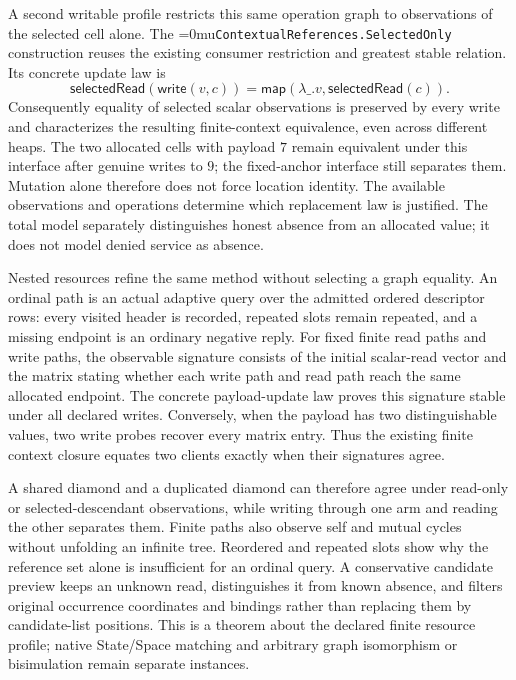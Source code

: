 \documentclass[11pt]{article}
\newcommand{\leanname}[1]{\textup{\Urlmuskip=0mu\relax\nolinkurl{#1}}}
\theoremstyle{definition}
\theoremstyle{remark}
\begin{document}
A second writable profile restricts this same operation graph to observations
of the selected cell alone. The
\leanname{ContextualReferences.SelectedOnly} construction reuses the existing
consumer restriction and greatest stable relation. Its concrete update law is
\[
  \mathsf{selectedRead}(\mathsf{write}(v,c))
   =\mathsf{map}(\lambda\_.v,\mathsf{selectedRead}(c)).
\]
Consequently equality of selected scalar observations is preserved by every
write and characterizes the resulting finite-context equivalence, even
across different heaps. The two allocated cells with payload $7$ remain
equivalent under this interface after genuine writes to $9$; the fixed-anchor
interface still separates them. Mutation alone therefore does not force
location identity. The available observations and operations determine which
replacement law is justified. The total model separately distinguishes honest
absence from an allocated value; it does not model denied service as absence.

Nested resources refine the same method without selecting a graph equality.
An ordinal path is an actual adaptive query over the admitted ordered
descriptor rows: every visited header is recorded, repeated slots remain
repeated, and a missing endpoint is an ordinary negative reply. For fixed
finite read paths and write paths, the observable signature consists of the
initial scalar-read vector and the matrix stating whether each write path and
read path reach the same allocated endpoint. The concrete payload-update law
proves this signature stable under all declared writes. Conversely, when the
payload has two distinguishable values, two write probes recover every matrix
entry. Thus the existing finite context closure equates two clients exactly
when their signatures agree.

A shared diamond and a duplicated diamond can therefore agree under read-only
or selected-descendant observations, while writing through one arm and reading
the other separates them. Finite paths also observe self and mutual cycles
without unfolding an infinite tree. Reordered and repeated slots show why the
reference set alone is insufficient for an ordinal query. A conservative
candidate preview keeps an unknown read, distinguishes it from known absence,
and filters original occurrence coordinates and bindings rather than replacing
them by candidate-list positions. This is a theorem about the declared finite
resource profile; native State/Space matching and arbitrary graph
isomorphism or bisimulation remain separate instances.
\end{document}
